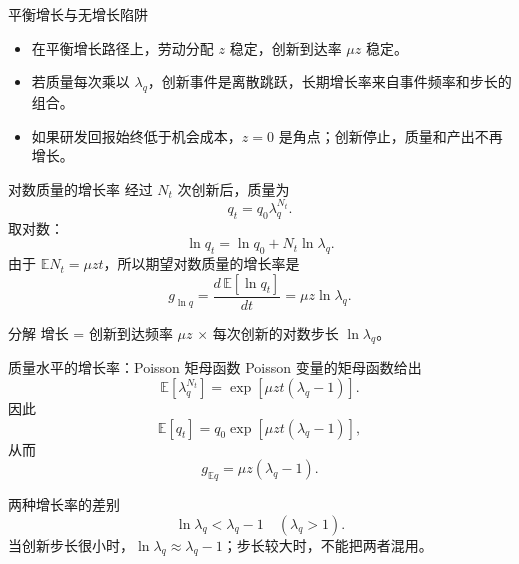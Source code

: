 \documentclass[aspectratio=32]{beamer}
\begin{document}
\begin{frame}{平衡增长与无增长陷阱}
\small
\begin{itemize}
  \item 在平衡增长路径上，劳动分配 $z$ 稳定，创新到达率 $\mu z$ 稳定。
  \item 若质量每次乘以 $\lambda_q$，创新事件是离散跳跃，长期增长率来自事件频率和步长的组合。
  \item 如果研发回报始终低于机会成本，$z=0$ 是角点；创新停止，质量和产出不再增长。
\end{itemize}
\begin{center}
\end{center}
\end{frame}

\begin{frame}{对数质量的增长率}
\small
经过 $N_t$ 次创新后，质量为
\[
  q_t=q_0\lambda_q^{N_t}.
\]
取对数：
\[
  \ln q_t=\ln q_0+N_t\ln\lambda_q.
\]
由于 $\mathbb{E}N_t=\mu zt$，所以期望对数质量的增长率是
\[
  \boxed{g_{\ln q}=\frac{d\,\mathbb{E}[\ln q_t]}{dt}
  =\mu z\ln\lambda_q}.
\]
\begin{block}{分解}
增长 = 创新到达频率 $\mu z$ $\times$ 每次创新的对数步长 $\ln\lambda_q$。
\end{block}
\end{frame}

\begin{frame}{质量水平的增长率：Poisson 矩母函数}
\footnotesize
Poisson 变量的矩母函数给出
\[
  \mathbb{E}[\lambda_q^{N_t}]
  =\exp\left[\mu zt(\lambda_q-1)\right].
\]
因此
\[
  \mathbb{E}[q_t]
  =q_0\exp\left[\mu zt(\lambda_q-1)\right],
\]
从而
\[
  \boxed{g_{\mathbb{E}q}=\mu z(\lambda_q-1)}.
\]
\begin{alertblock}{两种增长率的差别}
\[
  \ln\lambda_q<\lambda_q-1\quad(\lambda_q>1).
\]
当创新步长很小时，$\ln\lambda_q\approx\lambda_q-1$；步长较大时，不能把两者混用。
\end{alertblock}
\end{frame}
\end{document}
